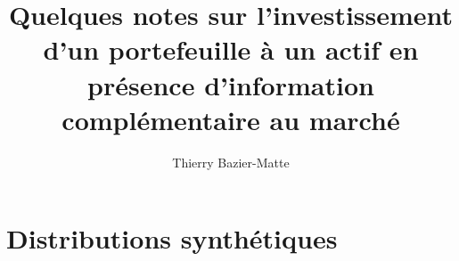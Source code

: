 \documentclass{article}
\title{Quelques notes sur l'investissement d'un portefeuille à un actif en présence
  d'information complémentaire au marché}
\author{Thierry Bazier-Matte}
\begin{document}
\maketitle
\tableofcontents

\newpage

\newpage

\newpage

\newpage


\section{Distributions synthétiques}

\newpage

\newpage
\end{document}
